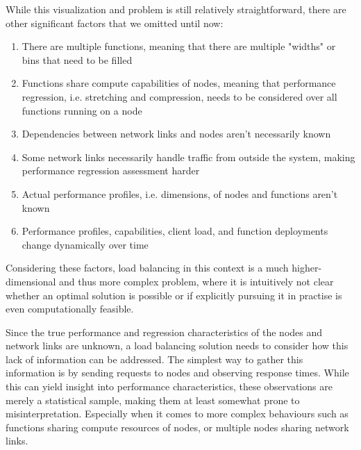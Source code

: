 While this visualization and problem is still relatively straightforward, there are other significant factors that we omitted until now:
\begin{enumerate}
    \item There are multiple functions, meaning that there are multiple "widths" or bins that need to be filled
    \item Functions share compute capabilities of nodes, meaning that performance regression, i.e. stretching and compression, needs to be considered over all functions running on a node
    \item Dependencies between network links and nodes aren't necessarily known
    \item Some network links necessarily handle traffic from outside the system, making performance regression assessment harder
    \item Actual performance profiles, i.e. dimensions, of nodes and functions aren't known
    \item Performance profiles, capabilities, client load, and function deployments change dynamically over time
\end{enumerate}

Considering these factors, load balancing in this context is a much higher-dimensional and thus more complex problem, where it is intuitively not clear whether an optimal solution is possible or if explicitly pursuing it in practise is even computationally feasible.


Since the true performance and regression characteristics of the nodes and network links are unknown, a load balancing solution needs to consider how this lack of information can be addressed. 
The simplest way to gather this information is by sending requests to nodes and observing response times. While this can yield insight into performance characteristics, these observations are merely a statistical sample, making them at least somewhat prone to misinterpretation. Especially when it comes to more complex behaviours such as functions sharing compute resources of nodes, or multiple nodes sharing network links.

